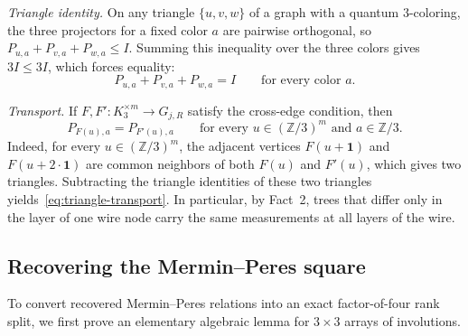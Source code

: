 \begin{list}{}{\setlength{\labelwidth}{3.6em}\setlength{\labelsep}{0.6em}\setlength{\leftmargin}{4.2em}\setlength{\itemsep}{3pt}\setlength{\parsep}{0pt}\setlength{\topsep}{4pt}}
\item[\textup{Fact 6.}] \emph{Triangle identity.} On any triangle $\{u,v,w\}$ of a graph with a quantum $3$-coloring, the three projectors for a fixed color $a$ are pairwise orthogonal, so $P_{u,a}+P_{v,a}+P_{w,a}\le I$. Summing this inequality over the three colors gives $3I\le3I$, which forces equality:
\[
 P_{u,a}+P_{v,a}+P_{w,a}=I\qquad\text{for every color }a.
\]
\item[\textup{Fact 7.}] \emph{Transport.} If $F,F':K_3^{\times m}\to G_{j,R}$ satisfy the cross-edge condition, then
\begin{equation}\label{eq:triangle-transport}
 P_{F(u),a}=P_{F'(u),a}\qquad\text{for every }u\in(\mathbb Z/3)^m\text{ and }a\in\mathbb Z/3.
\end{equation}
Indeed, for every $u\in(\mathbb Z/3)^m$, the adjacent vertices $F(u+\mathbf 1)$ and $F(u+2\cdot\mathbf 1)$ are common neighbors of both $F(u)$ and $F'(u)$, which gives two triangles. Subtracting the triangle identities of these two triangles yields~\eqref{eq:triangle-transport}. In particular, by Fact~2, trees that differ only in the layer of one wire node carry the same measurements at all layers of the wire.
\end{list}

\subsection{Recovering the Mermin--Peres square}\label{sec:square-recovery}

To convert recovered Mermin--Peres relations into an exact factor-of-four rank split, we first prove an elementary algebraic lemma for $3\times3$ arrays of involutions.

